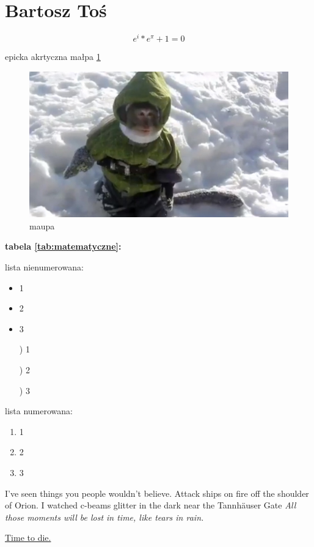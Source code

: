\newpage
\section{Bartosz Toś}


\[e^i*e^\pi + 1 = 0\]


epicka akrtyczna małpa \ref{fig:maupa}
\begin{figure}[htbp]

    \centering
    \includegraphics[scale=0.25]{pictures/arktyczna_maupa.jpg}
    
    \caption{maupa}
    \label{fig:maupa}
\end{figure}

\vspace{9 cm}

\textbf{tabela \ref{tab:matematyczne}:}


\vspace{2 cm}

lista nienumerowana:

\begin{itemize}
  \item  1
  \item  2
  \item  3
\end{itemize}

\begin{itemize}
  \item[)]  1
  \item[)]  2
  \item[)]  3
\end{itemize}


lista numerowana:
\begin{enumerate}
  \item  1
  \item  2
  \item  3
\end{enumerate}
\vspace{2 cm}
\par
\begin{flushleft}
I've seen things you people wouldn't believe.
Attack ships on fire off the shoulder of Orion.
I watched c-beams glitter in the dark near the Tannhäuser Gate 
\emph{All those moments will be lost in time, like tears in rain.}
\end{flushleft}
\begin{flushright}
\par
\underline{Time to die.} 
\end{flushright}